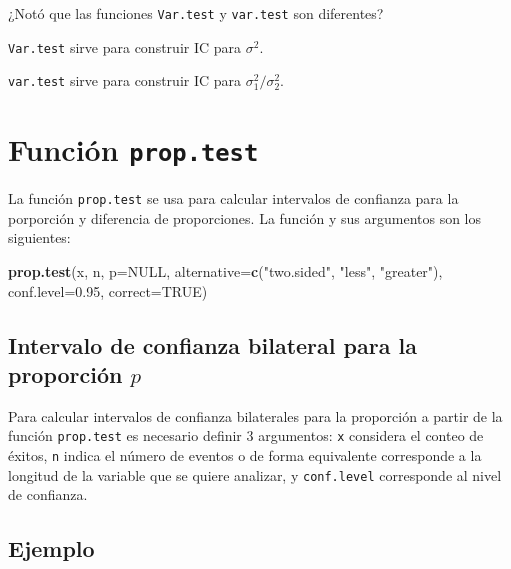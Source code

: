 \documentclass[10pt,]{krantz}
\makeatletter
\newenvironment{Shaded}{\begin{snugshade}}{\end{snugshade}}
\newcommand{\KeywordTok}[1]{\textcolor[rgb]{0.13,0.29,0.53}{\textbf{{#1}}}}
\newcommand{\DataTypeTok}[1]{\textcolor[rgb]{0.13,0.29,0.53}{{#1}}}
\newcommand{\FloatTok}[1]{\textcolor[rgb]{0.00,0.00,0.81}{{#1}}}
\newcommand{\StringTok}[1]{\textcolor[rgb]{0.31,0.60,0.02}{{#1}}}
\newcommand{\OtherTok}[1]{\textcolor[rgb]{0.56,0.35,0.01}{{#1}}}
\newcommand{\NormalTok}[1]{{#1}}
\newenvironment{kframe}{%
\medskip{}
\setlength{\fboxsep}{.8em}
 \def\at@end@of@kframe{}%
 \ifinner\ifhmode%
  \def\at@end@of@kframe{\end{minipage}}%
  \begin{minipage}{\columnwidth}%
 \fi\fi%
 \def\FrameCommand##1{\hskip\@totalleftmargin \hskip-\fboxsep
 \colorbox{shadecolor}{##1}\hskip-\fboxsep
     \hskip-\linewidth \hskip-\@totalleftmargin \hskip\columnwidth}%
 \MakeFramed {\advance\hsize-\width
   \@totalleftmargin\z@ \linewidth\hsize
   \@setminipage}}%
 {\par\unskip\endMakeFramed%
 \at@end@of@kframe}
\renewenvironment{Shaded}{\begin{kframe}}{\end{kframe}}
\let\BeginKnitrBlock\begin \let\EndKnitrBlock\end
\makeatother
\begin{document}
\BeginKnitrBlock{rmdwarning}
¿Notó que las funciones \texttt{Var.test} y \texttt{var.test} son
diferentes?

\texttt{Var.test} sirve para construir IC para \(\sigma^2\).

\texttt{var.test} sirve para construir IC para
\(\sigma_1^2 / \sigma_2^2\).
\EndKnitrBlock{rmdwarning}

\section{\texorpdfstring{Función
\texttt{prop.test}}{Función prop.test}}\label{funcion-prop.test}

La función \texttt{prop.test} se usa para calcular intervalos de
confianza para la porporción y diferencia de proporciones. La función y
sus argumentos son los siguientes:

\begin{Shaded}
\begin{Highlighting}[]
\KeywordTok{prop.test}\NormalTok{(x, n, }\DataTypeTok{p=}\OtherTok{NULL}\NormalTok{,}
          \DataTypeTok{alternative=}\KeywordTok{c}\NormalTok{(}\StringTok{"two.sided"}\NormalTok{, }\StringTok{"less"}\NormalTok{, }\StringTok{"greater"}\NormalTok{),}
          \DataTypeTok{conf.level=}\FloatTok{0.95}\NormalTok{, }\DataTypeTok{correct=}\OtherTok{TRUE}\NormalTok{)}
\end{Highlighting}
\end{Shaded}

\subsection{\texorpdfstring{Intervalo de confianza bilateral para la
proporción
\(p\)}{Intervalo de confianza bilateral para la proporción p}}\label{intervalo-de-confianza-bilateral-para-la-proporcion-p}

Para calcular intervalos de confianza bilaterales para la proporción a
partir de la función \texttt{prop.test} es necesario definir 3
argumentos: \texttt{x} considera el conteo de éxitos, \texttt{n} indica
el número de eventos o de forma equivalente corresponde a la longitud de
la variable que se quiere analizar, y \texttt{conf.level} corresponde al
nivel de confianza.

\subsection*{Ejemplo}\label{ejemplo-59}
\end{document}
